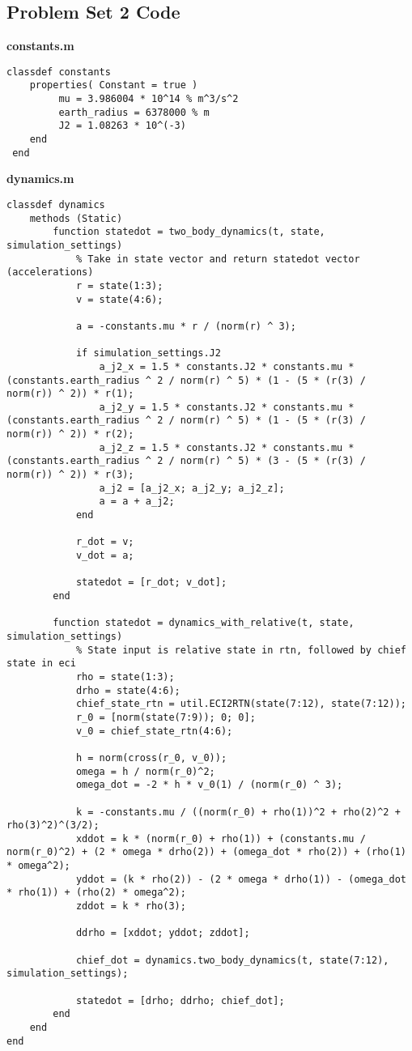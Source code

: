 \subsection{Problem Set 2 Code}

\textbf{constants.m}
\begin{lstlisting}
classdef constants
    properties( Constant = true )
         mu = 3.986004 * 10^14 % m^3/s^2
         earth_radius = 6378000 % m
         J2 = 1.08263 * 10^(-3)
    end
 end
\end{lstlisting}

\textbf{dynamics.m}
\begin{lstlisting}
classdef dynamics
    methods (Static)
        function statedot = two_body_dynamics(t, state, simulation_settings)
            % Take in state vector and return statedot vector (accelerations)
            r = state(1:3);
            v = state(4:6);

            a = -constants.mu * r / (norm(r) ^ 3);

            if simulation_settings.J2
                a_j2_x = 1.5 * constants.J2 * constants.mu * (constants.earth_radius ^ 2 / norm(r) ^ 5) * (1 - (5 * (r(3) / norm(r)) ^ 2)) * r(1);
                a_j2_y = 1.5 * constants.J2 * constants.mu * (constants.earth_radius ^ 2 / norm(r) ^ 5) * (1 - (5 * (r(3) / norm(r)) ^ 2)) * r(2);
                a_j2_z = 1.5 * constants.J2 * constants.mu * (constants.earth_radius ^ 2 / norm(r) ^ 5) * (3 - (5 * (r(3) / norm(r)) ^ 2)) * r(3);
                a_j2 = [a_j2_x; a_j2_y; a_j2_z];
                a = a + a_j2;
            end

            r_dot = v;
            v_dot = a;

            statedot = [r_dot; v_dot];
        end

        function statedot = dynamics_with_relative(t, state, simulation_settings)
            % State input is relative state in rtn, followed by chief state in eci
            rho = state(1:3);
            drho = state(4:6);
            chief_state_rtn = util.ECI2RTN(state(7:12), state(7:12));
            r_0 = [norm(state(7:9)); 0; 0];
            v_0 = chief_state_rtn(4:6);

            h = norm(cross(r_0, v_0));
            omega = h / norm(r_0)^2;
            omega_dot = -2 * h * v_0(1) / (norm(r_0) ^ 3);
        
            k = -constants.mu / ((norm(r_0) + rho(1))^2 + rho(2)^2 + rho(3)^2)^(3/2);
            xddot = k * (norm(r_0) + rho(1)) + (constants.mu / norm(r_0)^2) + (2 * omega * drho(2)) + (omega_dot * rho(2)) + (rho(1) * omega^2);
            yddot = (k * rho(2)) - (2 * omega * drho(1)) - (omega_dot * rho(1)) + (rho(2) * omega^2);
            zddot = k * rho(3);

            ddrho = [xddot; yddot; zddot];

            chief_dot = dynamics.two_body_dynamics(t, state(7:12), simulation_settings);
            
            statedot = [drho; ddrho; chief_dot];
        end
    end
end
\end{lstlisting}

